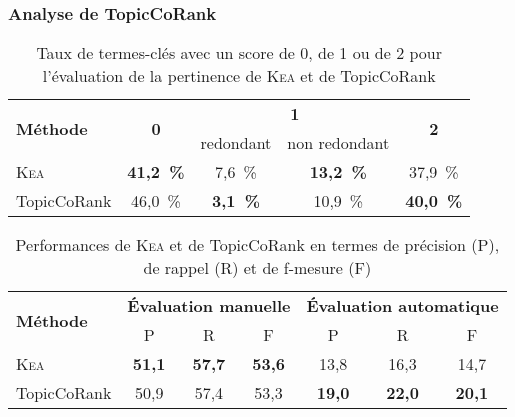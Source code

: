       \subsubsection{Analyse de TopicCoRank}
      \label{subsubsec:main-domain_specific_keyphrase_annotation-manual_evaluation-analysis-topiccorank}
        \TODO{\dots}
        \begin{table}[h!]
          \centering
          \begin{tabular}{l|c|c|c|c}
            \toprule
            \multirow{2}{*}{\textbf{Méthode}} & \multirow{2}{*}{\textbf{0}} & \multicolumn{2}{c|}{\textbf{1}} & \multirow{2}{*}{\textbf{2}}\\
            \cline{3-4}
            & & \multicolumn{1}{p{.175\linewidth}|}{\centering{}redondant} & \multicolumn{1}{p{.175\linewidth}|}{\centering{}non redondant} &\\
            \hline
            \textsc{Kea} & \textbf{41,2~\%} & 7,6~\% & \textbf{13,2~\%} & 37,9~\%\\
            TopicCoRank & 46,0~\% & \textbf{3,1~\%} & 10,9~\% & \textbf{40,0~\%}\\
            \bottomrule
          \end{tabular}
          \caption{Taux de termes-clés avec un score de 0, de 1 ou de 2 pour
                   l'évaluation de la pertinence de \textsc{Kea} et de
                   TopicCoRank
                   \label{tab:main-domain_specific_keyphrase_annotation-manual_evaluation-analysis-topiccorank-pertinence_score_ratio}}
        \end{table}

        \TODO{\dots}
        \begin{table}[h!]
          \centering
          \begin{tabular}{l|ccc|ccc}
            \toprule
            \multirow{2}{*}{\textbf{Méthode}} & \multicolumn{3}{c|}{\textbf{Évaluation manuelle}} & \multicolumn{3}{c}{\textbf{Évaluation automatique}}\\
            \cline{2-7}
            & P & R & F & P & R & F\\
            \hline
            \textsc{Kea} & \textbf{51,1} & \textbf{57,7} & \textbf{53,6} & 13,8 & 16,3 & 14,7\\
            TopicCoRank & 50,9 & 57,4 & 53,3 & \textbf{19,0} & \textbf{22,0} & \textbf{20,1}\\
            \bottomrule
          \end{tabular}
          \caption[
            Performances de \textsc{Kea} et de TopicCoRank en termes de
            précision, de rappel et de f-mesure
          ]{
            Performances de \textsc{Kea} et de TopicCoRank en termes de
            précision (P), de rappel (R) et de f-mesure (F)
            \label{tab:main-domain_specific_keyphrase_annotation-manual_evaluation-analysis-topiccorank-prf}}
        \end{table}
      
